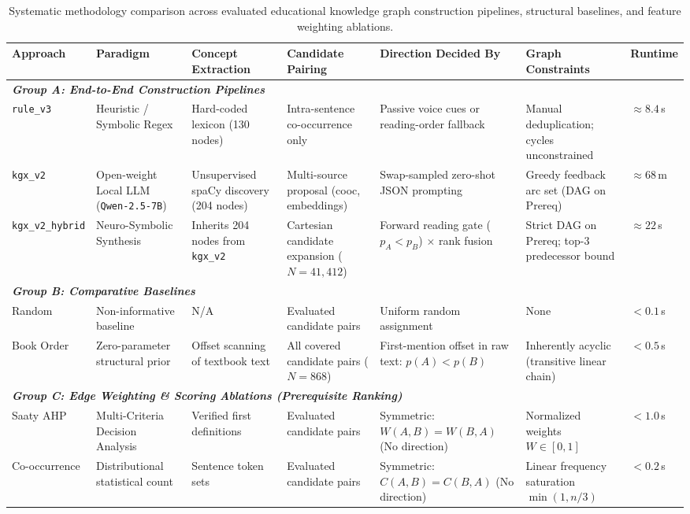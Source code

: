 \begin{table}[t]
\centering
\small
\caption{Systematic methodology comparison across evaluated educational knowledge graph construction pipelines, structural baselines, and feature weighting ablations.}
\label{tab:methodology_comparison}
\begin{tabularx}{\textwidth}{l p{2.4cm} p{2.2cm} p{2.4cm} p{2.2cm} p{2.5cm} l}
\toprule
\textbf{Approach} & \textbf{Paradigm} & \textbf{Concept Extraction} & \textbf{Candidate Pairing} & \textbf{Direction Decided By} & \textbf{Graph Constraints} & \textbf{Runtime} \\
\midrule
\multicolumn{7}{l}{\textit{\textbf{Group A: End-to-End Construction Pipelines}}} \\
\addlinespace[2pt]
\texttt{rule\_v3} & Heuristic / Symbolic Regex & Hard-coded lexicon (130 nodes) & Intra-sentence co-occurrence only & Passive voice cues or reading-order fallback & Manual deduplication; cycles unconstrained & $\approx 8.4$\,s \\
\addlinespace[3pt]
\texttt{kgx\_v2} & Open-weight Local LLM (\texttt{Qwen-2.5-7B}) & Unsupervised spaCy discovery (204 nodes) & Multi-source proposal (cooc, embeddings) & Swap-sampled zero-shot JSON prompting & Greedy feedback arc set (DAG on Prereq) & $\approx 68$\,m \\
\addlinespace[3pt]
\texttt{kgx\_v2\_hybrid} & Neuro-Symbolic Synthesis & Inherits 204 nodes from \texttt{kgx\_v2} & Cartesian candidate expansion ($N=41{,}412$) & Forward reading gate ($p_A < p_B$) $\times$ rank fusion & Strict DAG on Prereq; top-$3$ predecessor bound & $\approx 22$\,s \\
\midrule
\multicolumn{7}{l}{\textit{\textbf{Group B: Comparative Baselines}}} \\
\addlinespace[2pt]
Random & Non-informative baseline & N/A & Evaluated candidate pairs & Uniform random assignment & None & $< 0.1$\,s \\
\addlinespace[3pt]
Book Order & Zero-parameter structural prior & Offset scanning of textbook text & All covered candidate pairs ($N=868$) & First-mention offset in raw text: $p(A) < p(B)$ & Inherently acyclic (transitive linear chain) & $< 0.5$\,s \\
\midrule
\multicolumn{7}{l}{\textit{\textbf{Group C: Edge Weighting \& Scoring Ablations (Prerequisite Ranking)}}} \\
\addlinespace[2pt]
Saaty AHP & Multi-Criteria Decision Analysis & Verified first definitions & Evaluated candidate pairs & Symmetric: $W(A,B) = W(B,A)$ (No direction) & Normalized weights $W \in [0, 1]$ & $< 1.0$\,s \\
Co-occurrence & Distributional statistical count & Sentence token sets & Evaluated candidate pairs & Symmetric: $C(A,B) = C(B,A)$ (No direction) & Linear frequency saturation $\min(1, n/3)$ & $< 0.2$\,s \\
\bottomrule
\end{tabularx}
\end{table}

